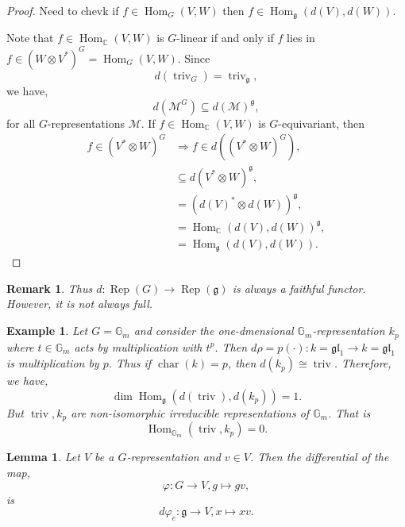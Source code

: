 \documentclass[10pt]{article}
\newtheorem{lemma}{Lemma}[section]
\newtheorem{remark}{Remark}[section]
\newtheorem{example}{Example}[section]
\numberwithin{equation}{theorem}
\DeclareMathOperator{\chr}{char}
\DeclareMathOperator{\triv}{triv}
\DeclareMathOperator{\Rep}{Rep}
\DeclareMathOperator{\Hom}{Hom}
\newcommand{\C}[0]{\mathbb{C}}
\newcommand{\G}[0]{\mathbb{G}}
\newcommand{\g}[0]{\mathfrak{g}}
\newcommand{\gl}[0]{\mathfrak{gl}}
\begin{document}
\begin{proof}
  Need to chevk if $f\in\Hom_G(V,W)$ then $f\in\Hom_\g(d(V),d(W))$.\\
  \par Note that $f\in\Hom_\C(V,W)$ is $G$-linear if and only if $f$ lies in $f\in (W\otimes V^*)^G = \Hom_G(V,W)$. Since 
  \begin{equation*}
    d(\triv_G) = \triv_\g,
  \end{equation*}
  we have, 
  \begin{equation*}
    d(\mathcal{M}^G)\subseteq d(\mathcal{M})^\g,
  \end{equation*}
  for all $G$-representations $\mathcal{M}$. If $f\in\Hom_\C(V,W)$ is $G$-equivariant, then
  \begin{align*}
    f\in (V^*\otimes W)^G& \Rightarrow f\in d((V^*\otimes W)^G),\\
    & \subseteq d(V^*\otimes W)^\g,\\
    & = (d(V)^*\otimes d(W))^\g,\\
    &= \Hom_\C(d(V),d(W))^\g,\\
    &= \Hom_\g(d(V),d(W)).
  \end{align*}
\end{proof}
\begin{remark}
  Thus $d:\Rep(G)\to\Rep(\g)$ is always a faithful functor. However, it is not always full.
\end{remark}
\begin{example}
  Let $G=\G_m$ and consider the one-dmensional $\G_m$-representation $k_p$ where $t\in\G_m$ acts by multiplication with $t^p$. 
  Then $d\rho=p(\cdot):k=\gl_1\to k=\gl_1$ is multiplication by $p$. Thus if $\chr(k) = p$, then $d(k_p) \cong \triv$. Therefore, we have,
  \begin{equation*}
    \dim\Hom_\g(d(\triv),d(k_p))=1.
  \end{equation*}
  But $\triv,k_p$ are non-isomorphic irreducible representations of $\G_m$. That is 
  \begin{equation*}
    \Hom_{\G_m}(\triv,k_p)=0.
  \end{equation*}
\end{example}
\begin{lemma}
  \label{lemma_5_23}
  Let $V$ be a $G$-representation and $v\in V$. Then the differential of the map,
  \begin{equation*}
    \varphi:G\to V, g\mapsto gv,
  \end{equation*}
  is 
  \begin{equation*}
    d\varphi_e:\g\to V, x\mapsto xv.
  \end{equation*}
\end{lemma}
\end{document}
